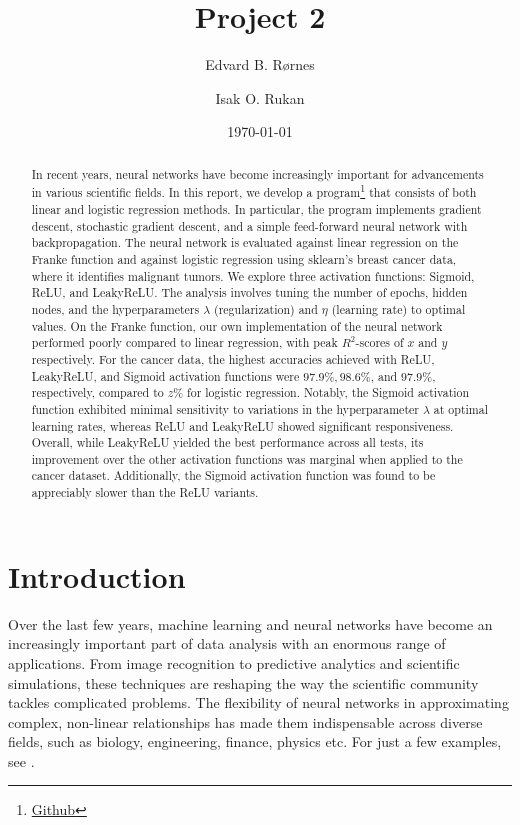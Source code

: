 \documentclass[%
reprint,
amsmath,amssymb,
aps,
]{revtex4-2}
\begin{document}
	
\title{Project 2}
\author{Edvard B. Rørnes}
\author{Isak O. Rukan}
\date{\today}

\begin{abstract}
	In recent years, neural networks have become increasingly important for advancements in various scientific fields. In this report, we develop a program\footnote{\href{https://github.com/EdvardRornes/FYS-STK4155/tree/main/Project1}{Github}} that consists of both linear and logistic regression methods. In particular, the program implements gradient descent, stochastic gradient descent, and a simple feed-forward neural network with backpropagation. The neural network is evaluated against linear regression on the Franke function and against logistic regression using sklearn's breast cancer data, where it identifies malignant tumors. We explore three activation functions: Sigmoid, ReLU, and LeakyReLU. The analysis involves tuning the number of epochs, hidden nodes, and the hyperparameters $\lambda$ (regularization) and $\eta$ (learning rate) to optimal values. On the Franke function, our own implementation of the neural network performed poorly compared to linear regression, with peak $R^2$-scores of $x$ and $y$ respectively. For the cancer data, the highest accuracies achieved with ReLU, LeakyReLU, and Sigmoid activation functions were $97.9\%, 98.6\%$, and $97.9\%$, respectively, compared to $z\%$ for logistic regression. Notably, the Sigmoid activation function exhibited minimal sensitivity to variations in the hyperparameter $\lambda$ at optimal learning rates, whereas ReLU and LeakyReLU showed significant responsiveness. Overall, while LeakyReLU yielded the best performance across all tests, its improvement over the other activation functions was marginal when applied to the cancer dataset. Additionally, the Sigmoid activation function was found to be appreciably slower than the ReLU variants.
\end{abstract}

\maketitle

\section{Introduction}
Over the last few years, machine learning and neural networks have become an increasingly important part of data analysis with an enormous range of applications. From image recognition to predictive analytics and scientific simulations, these techniques are reshaping the way the scientific community tackles complicated problems. The flexibility of neural networks in approximating complex, non-linear relationships has made them indispensable across diverse fields, such as biology, engineering, finance, physics etc. For just a few examples, see \cite{dawid2023modernapplicationsmachinelearning,thapar2023applicationsmachinelearningmodelling,mohammadi2022applicationsmachinelearninghealthcare}.
\end{document}
